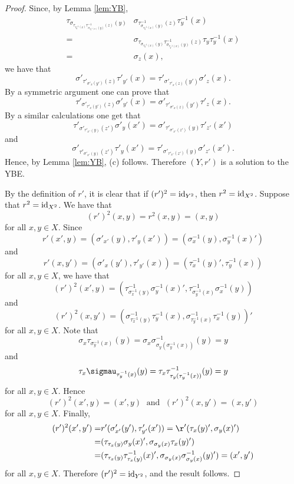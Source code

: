 \begin{proof}
Since, by Lemma \ref{lem:YB},
\begin{align*}
\tau_{\sigma_{\tau_{\tau^{-1}_y(x)}\tau^{-1}_{\sigma_{\tau^{-1}_y(x)}(y)}(z)}(y)}&\sigma_{\tau^{-1}_{\sigma_{\tau^{-1}_y(x)}(y)}(z)}\tau^{-1}_y(x)\\
=&\sigma_{\tau_{\sigma_{\tau^{-1}_y(x)}(y)}\tau^{-1}_{\sigma_{\tau^{-1}_y(x)}(y)}(z)} \tau_y{\tau^{-1}_y}(x)\\
=&\sigma_z(x), 
\end{align*}
we have that
\[\sigma'_{\tau'_{\sigma'_x(y')}(z)}\tau'_{y'}(x)=\tau'_{\sigma'_{\tau'_x(z)}(y')}\sigma'_{z}(x).\]
By a symmetric argument one can prove that
\[\tau'_{\sigma'_{\tau'_x(y')}(z)}\sigma'_{y'}(x)=\sigma'_{\tau'_{\sigma'_x(z)}(y')}\tau'_{z}(x).\]
By a similar calculations one get that
\[\tau'_{\sigma'_{\tau'_{x'}(y)}(z')}\sigma'_{y}(x')=\sigma'_{\tau'_{\sigma'_{x'}(z')}(y)}\tau'_{z'}(x')\]
and
\[\sigma'_{\tau'_{\sigma'_{x'}(y)}(z')}\tau'_{y}(x')=\tau'_{\sigma'_{\tau'_{x'}(z')}(y)}\sigma'_{z'}(x').\]
Hence, by Lemma \ref{lem:YB}, (c) follows. Therefore $(Y,r')$ is a solution to the YBE. 

By the definition of $r'$, it is clear that if $(r')^2=\operatorname{id}_{Y^2}$, then $r^2=\operatorname{id}_{X^2}$. Suppose that $r^2=\operatorname{id}_{X^2}$. We have that
\[ (r')^2(x,y)=r^2(x,y)=(x,y)\]
for all $x,y\in X$. Since
\[ r'(x',y)=(\sigma'_{x'}(y),\tau'_y(x'))=(\sigma^{-1}_x(y),\sigma^{-1}_y(x)')\]
and 
\[ r'(x,y')=(\sigma'_{x}(y'),\tau'_{y'}(x))=(\tau^{-1}_x(y)',\tau^{-1}_y(x))\]
for all $x,y\in X$, we have that
\[ (r')^2(x',y)=(\tau^{-1}_{\sigma^{-1}_x(y)}\sigma^{-1}_y(x)',\tau^{-1}_{\sigma^{-1}_y(x)}\sigma^{-1}_x(y))\]
and
\[ (r')^2(x,y')=(\sigma^{-1}_{\tau^{-1}_x(y)}\tau^{-1}_y(x),\sigma^{-1}_{\tau^{-1}_y(x)}\tau^{-1}_x(y))'\]
for all $x,y\in X$. Note that
\[\sigma_x\tau_{\sigma^{-1}_y(x)}(y)=\sigma_x\sigma^{-1}_{\sigma_y(\sigma^{-1}_y(x))}(y)=y\]
and
\[\tau_x\sigmau_{\tau^{-1}_y(x)}(y)=\tau_x\tau^{-1}_{\tau_y(\tau^{-1}_y(x))}(y)=y\]
for all $x,y\in X$. Hence
\[ (r')^2(x',y)=(x',y)\; \text{ and }\; (r')^2(x,y')=(x,y')\]
for all $x,y\in X$.
Finally, 
\begin{align*}
(r')^2(x',y')=&r'(\sigma'_{x'}(y'),\tau'_{y'}(x'))=\r'(\tau_x(y)',\sigma_y(x)')\\
=&(\tau_{\tau_{x}(y)}\sigma_y(x)',\sigma_{\sigma_y(x)}\tau_x(y)')\\
=&(\tau_{\tau_{x}(y)}\tau^{-1}_{\tau_x(y)}(x)',\sigma_{\sigma_y(x)}\sigma^{-1}_{\sigma_y(x)}(y)')=(x',y')
\end{align*}
for all $x,y\in X$. Therefore $(r')^2=\operatorname{id}_{Y^2}$, and the result follows.
\end{proof}

